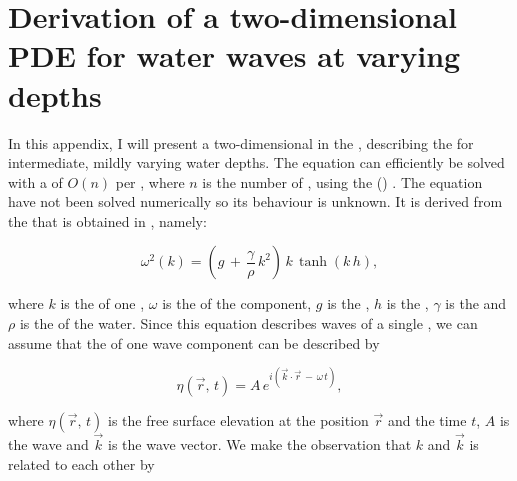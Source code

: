 \chapter{Derivation of a two-dimensional PDE for water waves at varying depths}

In this appendix, I will present a two-dimensional  in the , describing the  for intermediate, mildly varying water depths. The equation can efficiently be solved with a  of $O(n)$ per , where $n$ is the number of , using the  () \citep{White1994}. The equation have not been solved numerically so its behaviour is unknown. It is derived from the  that is obtained in , namely:

\begin{equation} \label{eq:dispersion}
\omega^2(k) = \left(g\,+\,\frac{\gamma}{\rho}\,k^2\right)\,k\,\tanh(k\,h),
\end{equation}

where $k$ is the  of one , $\omega$ is the  of the component, $g$ is the , $h$ is the , $\gamma$ is the  and $\rho$ is the  of the water. Since this equation describes waves of a single , we can assume that the  of one wave component can be described by

\begin{equation} \label{eq:component}
\eta(\vec{r},\,t) = A\,e^{i(\vec{k}\cdot\vec{r}\,-\,\omega\,t)},
\end{equation}

where $\eta(\vec{r},\,t)$ is the free surface elevation at the position $\vec{r}$ and the time $t$, $A$ is the wave  and $\vec{k}$ is the wave vector. We make the observation that $k$ and $\vec{k}$ is related to each other by

